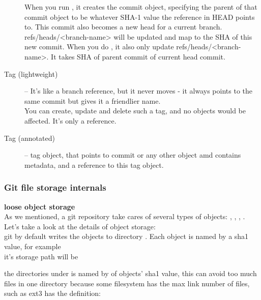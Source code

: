 \begin{description}
  When you run , it creates the commit object,
  specifying the parent of that commit object to be whatever SHA-1 value
  the reference in HEAD points to.
  This commit also becomes a new head for a current branch.
  refs/heads/<branch-name> will be updated and map to the SHA
  of this new commit.
  When you do ,
  it also only update refs/heads/<branch-name>.
  It takes SHA of parent commit of current head commit.
  \item[Tag (lightweight)] -- It's like a branch reference, but it never moves - it always points to the same commit but gives it a friendlier name.\\
  You can create, update and delete such a tag, and no objects would be affected.
  It's only a reference.
  \item[Tag (annotated)] -- tag object, that points to commit or any other object amd contains metadata, and a reference to this tag object.
\end{description}

\subsubsection{Git file storage internals}

\textbullet\textbf{\large{ loose object storage}}\\

As we mentioned, a git repository take cares of several types of objects:
, , , .
Let's take a look at the details of object storage:\\

git by default writes the objects to directory .
Each object is named by a sha1 value, for example \emph{}\\
it's storage path will be
\begin{center}
\emph{}
\end{center}
the directories under  is named by  of objects' sha1 value,
this can avoid too much files in one directory because some filesystem has the max link number of files,
such as ext3 has the definition:
\begin{flushleft}
\end{flushleft}

